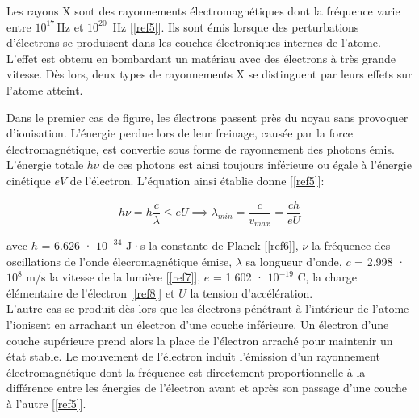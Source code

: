 \documentclass[a4paper, 12pt,oneside]{article}
\begin{document}
Les rayons X sont des rayonnements électromagnétiques dont la fréquence varie entre $10^{17}\,$Hz et $10^{20}$ \,Hz [\ref{ref5}]. Ils sont émis lorsque des perturbations d'électrons se produisent dans les couches électroniques internes de l'atome. L'effet est obtenu en bombardant un matériau avec des électrons à très grande vitesse. Dès lors, deux types de rayonnements X se distinguent par leurs effets sur l'atome atteint.

Dans le premier cas de figure, les électrons passent près du noyau sans provoquer d’ionisation. L’énergie perdue lors de leur freinage, causée par la force électromagnétique, est convertie sous forme de rayonnement des photons émis. L’énergie totale $h\nu$ de ces photons est ainsi toujours inférieure ou égale à l’énergie cinétique $eV$ de l’électron. L'équation ainsi établie donne [\ref{ref5}]:

\begin{equation}
    h\nu=h\frac{c}{\lambda} \leq eU
    \implies \lambda_{min} = \frac{c}{v_{max}} = \frac{ch}{eU}
    \label{eq1}
\end{equation}

avec $h$ = 6.626 · $10^{-34}$ J·s la constante de Planck [\ref{ref6}], $\nu$ la fréquence des oscillations de l’onde élecromagnétique émise, $\lambda$ sa longueur d’onde, $c$ = 2.998 · $10^8$ m/s la vitesse de la lumière [\ref{ref7}],
$e$ = 1.602 · $10^{-19}$ C, la charge élémentaire de l’électron [\ref{ref8}] et $U$ la tension d’accélération.\\

L'autre cas se produit dès lors que les électrons pénétrant à l'intérieur de l'atome l'ionisent en arrachant un électron d'une couche inférieure. Un électron d'une couche supérieure prend alors la place de l'électron arraché pour maintenir un état stable. Le mouvement de l'électron induit l'émission d'un rayonnement électromagnétique dont la fréquence est directement proportionnelle à la différence entre les énergies de l'électron avant et après son passage d'une couche à l'autre [\ref{ref5}].\\
\end{document}
